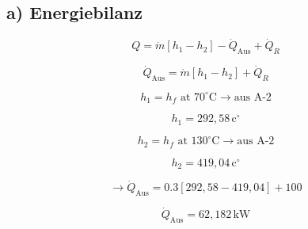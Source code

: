\subsection*{a) Energiebilanz}

\[
Q = \dot{m} [h_1 - h_2] - \dot{Q}_{\text{Aus}} + \dot{Q}_R
\]

\[
\dot{Q}_{\text{Aus}} = \dot{m} [h_1 - h_2] + \dot{Q}_R
\]

\[
h_1 = h_f \text{ at } 70^\circ \text{C} \rightarrow \text{aus A-2}
\]

\[
h_1 = 292,58 \, \text{c}^\circ
\]

\[
h_2 = h_f \text{ at } 130^\circ \text{C} \rightarrow \text{aus A-2}
\]

\[
h_2 = 419,04 \, \text{c}^\circ
\]

\[
\rightarrow \dot{Q}_{\text{Aus}} = 0.3 [292,58 - 419,04] + 100
\]

\[
\dot{Q}_{\text{Aus}} = 62,182 \, \text{kW}
\]